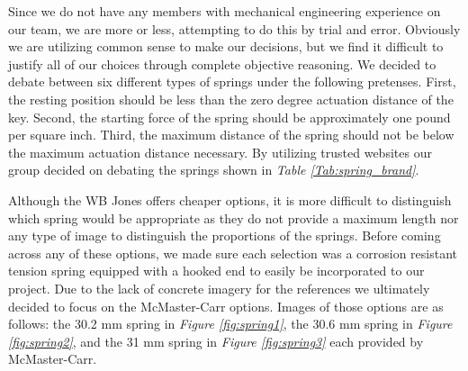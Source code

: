 Since we do not have any members with mechanical engineering experience on our team, we are more or less, attempting to do this by trial and error. Obviously we are utilizing common sense to make our decisions, but we find it difficult to justify all of our choices through complete objective reasoning. We decided to debate between six different types of springs under the following pretenses. First, the resting position should be less than the zero degree actuation distance of the key. Second, the starting force of the spring should be approximately one pound per square inch. Third, the maximum distance of the spring should not be below the maximum actuation distance necessary. By utilizing trusted websites our group decided on debating the springs shown in \textit{Table \ref{Tab:spring_brand}}.

\begin{table}[h!]
  \centering
  \caption{}
  \label{Tab:spring_brand}
\end{table}

Although the WB Jones offers cheaper options, it is more difficult to distinguish which spring would be appropriate as they do not provide a maximum length nor any type of image to distinguish the proportions of the springs. Before coming across any of these options, we made sure each selection was a corrosion resistant tension spring equipped with a hooked end to easily be incorporated to our project. Due to the lack of concrete imagery for the references we ultimately decided to focus on the McMaster-Carr options. Images of those options are as follows: the 30.2 mm spring in \textit{Figure \ref{fig:spring1}}, the 30.6 mm spring in \textit{Figure \ref{fig:spring2}}, and the 31 mm spring in \textit{Figure \ref{fig:spring3}} each provided by McMaster-Carr.

